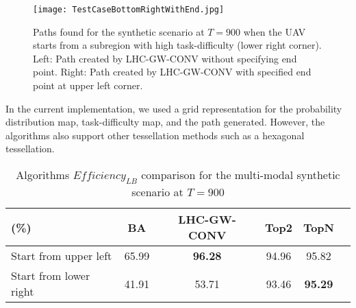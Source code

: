 \begin{figure}
\centering
\texttt{[image: TestCaseBottomRightWithEnd.jpg]}
\caption[Synthetic scenario UAV path starting from high task-difficulty subregion]{Paths found for the synthetic scenario at $T=900$ when the UAV starts from a subregion with high task-difficulty (lower right corner). Left: Path created by LHC-GW-CONV without specifying end point. Right: Path created by LHC-GW-CONV with specified end point at upper left corner.}
\label{SyntheticCasePaths3}
\end{figure}


In the current implementation, we used a grid representation for the probability distribution map, task-difficulty map, and the path generated. However, the algorithms also support other tessellation methods such as a hexagonal tessellation.
\begin{table}
\caption{Algorithms $\mathit{Efficiency_{LB}}$ comparison for the multi-modal synthetic scenario at $T=900$}
	\centering
		\begin{tabular}
			{|l|c|c|c|c|c|}
			\hline
			(\%) & BA & LHC-GW-CONV & Top2 & TopN \\
			\hline
			Start from upper left & 65.99 & \textbf{96.28} & 94.96 & 95.82 \\
			\hline			
			Start from lower right & 41.91 & 53.71 & 93.46 & \textbf{95.29} \\			\hline			
		\end{tabular}
\label{Synthetic}
\end{table}

